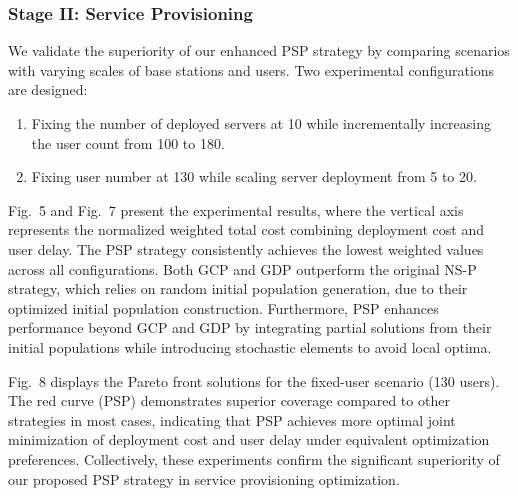 \documentclass[10pt, conference, letterpaper]{IEEEtran}
\begin{document}
\subsubsection{Stage II: Service Provisioning}
We validate the superiority of our enhanced PSP strategy by comparing scenarios with varying scales of base stations and users. Two experimental configurations are designed: 
\begin{enumerate}
    \item Fixing the number of deployed servers at 10 while incrementally increasing the user count from 100 to 180.
    \item Fixing user number at 130 while scaling server deployment from 5 to 20.
\end{enumerate}

Fig.~5 and Fig.~7 present the experimental results, where the vertical axis represents the normalized weighted total cost combining deployment cost and user delay. The PSP strategy consistently achieves the lowest weighted values across all configurations. Both GCP and GDP outperform the original NS-P strategy, which relies on random initial population generation, due to their optimized initial population construction. Furthermore, PSP enhances performance beyond GCP and GDP by integrating partial solutions from their initial populations while introducing stochastic elements to avoid local optima.

Fig.~8 displays the Pareto front solutions for the fixed-user scenario (130 users). The red curve (PSP) demonstrates superior coverage compared to other strategies in most cases, indicating that PSP achieves more optimal joint minimization of deployment cost and user delay under equivalent optimization preferences. Collectively, these experiments confirm the significant superiority of our proposed PSP strategy in service provisioning optimization.
\end{document}
